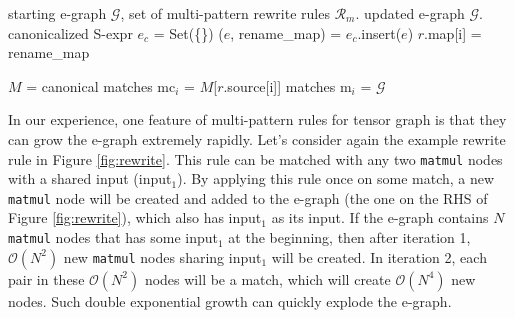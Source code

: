 \documentclass{article}
\newcommand{\CUT}[1]{\textcolor{yellow}{#1}}
\begin{document}
\begin{algorithm}[t]
\small
\caption{Applying multi-pattern rewrite rules}
\label{alg:multi}
\begin{algorithmic}[1]
\Require starting e-graph $\mathcal{G}$, set of multi-pattern rewrite rules $\mathcal{R}_m$.
\Ensure updated e-graph $\mathcal{G}$.
\State canonicalized S-expr $e_c$ = Set(\{\})
 
    \State ($e$, rename\_map) = 
    \State $e_c$.insert($e$)
    \State $r$.map[i] = rename\_map
\EndFor
\EndFor

    \State $M$ =  
        \State canonical matches mc$_i$ = $M$[$r$.source[i]]
        \State matches m$_i$ = 
        \EndFor
            \State {}
            \EndIf
        \EndFor
    \EndFor
  \EndFor
\State \Return $\mathcal{G}$
\end{algorithmic}
\end{algorithm}

In our experience, one feature of multi-pattern rules for tensor graph is that they can grow the e-graph extremely rapidly. 
Let's consider again the example rewrite rule in Figure \ref{fig:rewrite}. 
This rule can be matched with any two \texttt{matmul} nodes with a shared input (input$_1$). 
By applying this rule once on some match, a new \texttt{matmul} node will be created and added to the e-graph (the one on the RHS of Figure \ref{fig:rewrite}), which also has input$_1$ as its input. 
If the e-graph contains $N$ \texttt{matmul} nodes that has some input$_1$ at the beginning, then after iteration 1, $\mathcal{O}(N^2)$ new \texttt{matmul} nodes sharing input$_1$ will be created. 
In iteration 2, each pair in these $\mathcal{O}(N^2)$ nodes will be a match, which will create $\mathcal{O}(N^4)$ new nodes. 
Such double exponential growth can quickly explode the e-graph.
\end{document}
